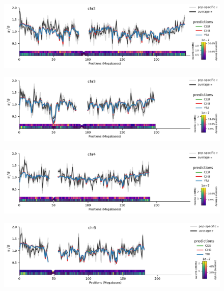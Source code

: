 \documentclass[11pt]{article}
\begin{document}
\begin{figure}[!htb]
  \centering
  \includegraphics[width=\textwidth]{figures/supplementary/pred_plot_chr2.pdf}
  \label{suppfig:fit-chr2}
\end{figure}


\begin{figure}[!htb]
  \centering
  \includegraphics[width=\textwidth]{figures/supplementary/pred_plot_chr3.pdf}
  \label{suppfig:fit-chr3}
\end{figure}


\begin{figure}[!htb]
  \centering
  \includegraphics[width=\textwidth]{figures/supplementary/pred_plot_chr4.pdf}
  \label{suppfig:fit-chr4}
\end{figure}


\begin{figure}[!htb]
  \centering
  \includegraphics[width=\textwidth]{figures/supplementary/pred_plot_chr5.pdf}
  \label{suppfig:fit-chr5}
\end{figure}
\end{document}
